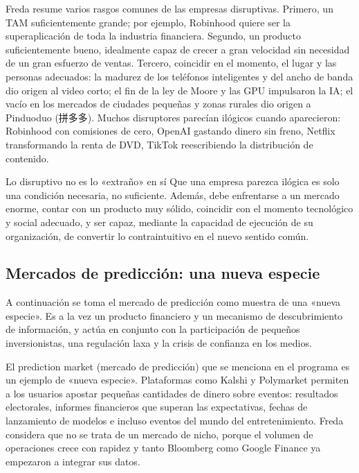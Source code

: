 Freda resume varios rasgos comunes de las empresas disruptivas. Primero, un TAM suficientemente grande; por ejemplo, Robinhood quiere ser la superaplicación de toda la industria financiera. Segundo, un producto suficientemente bueno, idealmente capaz de crecer a gran velocidad sin necesidad de un gran esfuerzo de ventas. Tercero, coincidir en el momento, el lugar y las personas adecuados: la madurez de los teléfonos inteligentes y del ancho de banda dio origen al video corto; el fin de la ley de Moore y las GPU impulsaron la IA; el vacío en los mercados de ciudades pequeñas y zonas rurales dio origen a Pinduoduo (拼多多). Muchos disruptores parecían ilógicos cuando aparecieron: Robinhood con comisiones de cero, OpenAI gastando dinero sin freno, Netflix transformando la renta de DVD, TikTok reescribiendo la distribución de contenido.

\begin{importantbox}{Lo disruptivo no es lo «extraño» en sí}
Que una empresa parezca ilógica es solo una condición necesaria, no suficiente. Además, debe enfrentarse a un mercado enorme, contar con un producto muy sólido, coincidir con el momento tecnológico y social adecuado, y ser capaz, mediante la capacidad de ejecución de su organización, de convertir lo contraintuitivo en el nuevo sentido común.
\end{importantbox}

\subsection{Mercados de predicción: una nueva especie}

A continuación se toma el mercado de predicción como muestra de una «nueva especie». Es a la vez un producto financiero y un mecanismo de descubrimiento de información, y actúa en conjunto con la participación de pequeños inversionistas, una regulación laxa y la crisis de confianza en los medios.

El prediction market (mercado de predicción) que se menciona en el programa es un ejemplo de «nueva especie». Plataformas como Kalshi y Polymarket permiten a los usuarios apostar pequeñas cantidades de dinero sobre eventos: resultados electorales, informes financieros que superan las expectativas, fechas de lanzamiento de modelos e incluso eventos del mundo del entretenimiento. Freda considera que no se trata de un mercado de nicho, porque el volumen de operaciones crece con rapidez y tanto Bloomberg como Google Finance ya empezaron a integrar sus datos.

